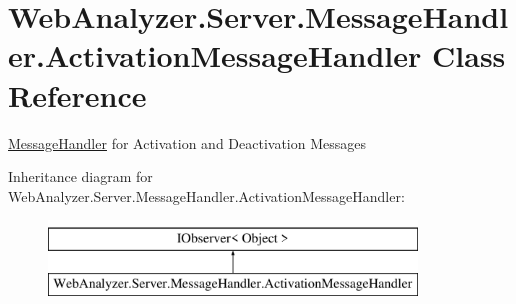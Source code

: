 \hypertarget{class_web_analyzer_1_1_server_1_1_message_handler_1_1_activation_message_handler}{}\section{Web\+Analyzer.\+Server.\+Message\+Handler.\+Activation\+Message\+Handler Class Reference}
\label{class_web_analyzer_1_1_server_1_1_message_handler_1_1_activation_message_handler}


\hyperlink{namespace_web_analyzer_1_1_server_1_1_message_handler}{Message\+Handler} for Activation and Deactivation Messages  


Inheritance diagram for Web\+Analyzer.\+Server.\+Message\+Handler.\+Activation\+Message\+Handler\+:\begin{figure}[H]
\begin{center}
\leavevmode
\includegraphics[height=2.000000cm]{class_web_analyzer_1_1_server_1_1_message_handler_1_1_activation_message_handler}
\end{center}
\end{figure}
